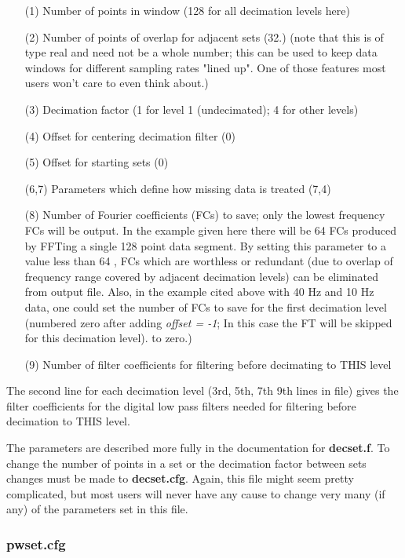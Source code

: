 \begin{itemize}
\item[(1)]
Number of points in window (128 for all decimation levels here)
\item[(2)]
Number of points of overlap for adjacent sets (32.)
(note that this is of type real and need not be a whole number;
this can be used to keep data windows
for different sampling rates "lined up".
One of those features most users won't care to even
think about.)
\item[(3)]
Decimation factor (1 for level 1 (undecimated); 4 for other levels)
\item[(4)]
Offset for centering decimation filter (0)
\item[(5)]
Offset for starting sets  (0)
\item[(6,7)]
Parameters which define how missing data is treated (7,4)
\item[(8)]
Number of Fourier coefficients (FCs) to save; only the
lowest frequency FCs will be output.  In the example given
here there will be 64 FCs produced by FFTing a single
128 point data segment.  By setting this parameter to a value
less than 64 , FCs which are worthless or redundant (due
to overlap of frequency range covered by adjacent decimation levels)
can be eliminated from output file.  Also, in the example cited above
with 40 Hz and 10 Hz data, one could set the number of FCs to save for
the first decimation level (numbered zero after adding {\it offset = -1};
In this case the FT will be skipped for this decimation level).
to zero.)
\item[(9)]
Number of filter coefficients for filtering before decimating to THIS level
\end{itemize}

The second line for each decimation level
(3rd, 5th, 7th 9th lines in file)
gives the filter coefficients for the digital low pass filters
needed for filtering before decimation to THIS level.

The parameters are described more fully in the documentation for
{\bf decset.f}.
To change the number of points in a set or the decimation
factor between sets changes must be made to {\bf decset.cfg}.
Again, this file might seem pretty complicated,
but most users will never have any cause
to change very many (if any) of the parameters set in this file.

\subsubsection{pwset.cfg}

